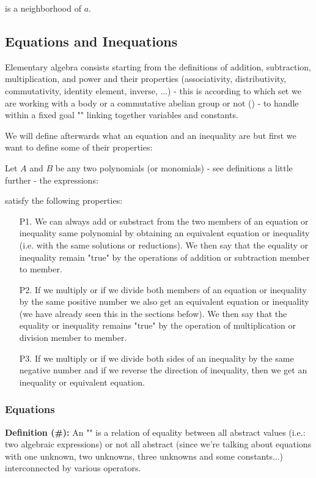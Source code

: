 is a neighborhood of $a$.

\subsection{Equations and Inequations}

Elementary algebra consists starting from the definitions of addition, subtraction, multiplication, and power and their properties (associativity, distributivity, commutativity, identity element, inverse, ...) - this is according to which set we are working with a body or a commutative abelian group or not () - to handle within a fixed goal "" linking together variables and constants.

We will define afterwards what an equation and an inequality are but first we want to define some of their properties:

Let $A$ and $B$ be any two polynomials (or monomials)  - see definitions a little further - the expressions:
	
satisfy the following properties:
	\begin{enumerate}
		\item[P1.] We can always add or substract from the two members of an equation or inequality same polynomial by obtaining an equivalent equation or inequality (i.e. with the same solutions or reductions). We then say that the equality or inequality remain "true" by the operations of addition or subtraction member to member.
		\item[P2.] If we multiply or if we divide both members of an equation or inequality by the same positive number we also get an equivalent equation or inequality (we have already seen this in the sections befow). We then say that the equality or inequality remains "true" by the operation of multiplication or division member to member.
		\item[P3.] If we multiply or if we divide both sides of an inequality by the same negative number and if we reverse the direction of inequality, then we get an inequality or equivalent equation.
	\end{enumerate}
	
	\subsubsection{Equations}
	\textbf{Definition (\#\mydef):} An "" is a relation of equality between all abstract values (i.e.: two algebraic expressions) or not all abstract (since we're talking about equations with one unknown, two unknowns, three unknowns and some constants...) interconnected by various operators.

